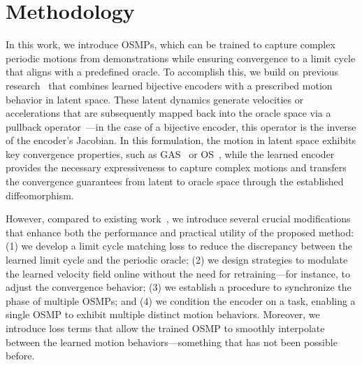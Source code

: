 \section{Methodology}
In this work, we introduce \glspl{OSMP}, which can be trained to capture complex periodic motions from demonstrations while ensuring convergence to a limit cycle that aligns with a predefined oracle. To accomplish this, we build on previous research~\citep{rana2020euclideanizing, zhi2024teaching} that combines learned bijective encoders with a prescribed motion behavior in latent space. These latent dynamics generate velocities or accelerations that are subsequently mapped back into the oracle space via a pullback operator~\citep{zhang2022learning}—in the case of a bijective encoder, this operator is the inverse of the encoder’s Jacobian. In this formulation, the motion in latent space exhibits key convergence properties, such as \gls{GAS}~\citep{rana2020euclideanizing, perez2023stable, sochopoulos2024learning} or \gls{OS}~\citep{zhi2024teaching}, while the learned encoder provides the necessary expressiveness to capture complex motions and transfers the convergence guarantees from latent to oracle space through the established diffeomorphism.

However, compared to existing work~\citep{zhi2024teaching}, we introduce several crucial modifications that enhance both the performance and practical utility of the proposed method: (1) we develop a limit cycle matching loss to reduce the discrepancy between the learned limit cycle and the periodic oracle; (2) we design strategies to modulate the learned velocity field online without the need for retraining—for instance, to adjust the convergence behavior; (3) we establish a procedure to synchronize the phase of multiple \glspl{OSMP}; and (4) we condition the encoder on a task, enabling a single \gls{OSMP} to exhibit multiple distinct motion behaviors. Moreover, we introduce loss terms that allow the trained \gls{OSMP} to smoothly interpolate between the learned motion behaviors—something that has not been possible before.

